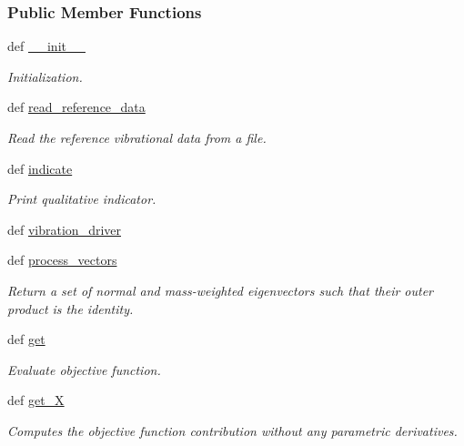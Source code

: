 \subsubsection*{Public Member Functions}
\begin{DoxyCompactItemize}
\item 
def \hyperlink{classforcebalance_1_1vibration_1_1Vibration_af449471c321f81318a76c327a9767cd9}{\-\_\-\-\_\-init\-\_\-\-\_\-}
\begin{DoxyCompactList}\small\item\em Initialization. \end{DoxyCompactList}\item 
def \hyperlink{classforcebalance_1_1vibration_1_1Vibration_ad3fc1fdf6452b11933d234b46b07071d}{read\-\_\-reference\-\_\-data}
\begin{DoxyCompactList}\small\item\em Read the reference vibrational data from a file. \end{DoxyCompactList}\item 
def \hyperlink{classforcebalance_1_1vibration_1_1Vibration_a1f13ce8796e3d089c9a361f43844bb98}{indicate}
\begin{DoxyCompactList}\small\item\em Print qualitative indicator. \end{DoxyCompactList}\item 
def \hyperlink{classforcebalance_1_1vibration_1_1Vibration_afa414133f30a224687fcd34eca008744}{vibration\-\_\-driver}
\item 
def \hyperlink{classforcebalance_1_1vibration_1_1Vibration_a5365302b992fdb2656aa2bc0bb6c6079}{process\-\_\-vectors}
\begin{DoxyCompactList}\small\item\em Return a set of normal and mass-\/weighted eigenvectors such that their outer product is the identity. \end{DoxyCompactList}\item 
def \hyperlink{classforcebalance_1_1vibration_1_1Vibration_a3b20f6a97f3aba4f704056ed12a999a5}{get}
\begin{DoxyCompactList}\small\item\em Evaluate objective function. \end{DoxyCompactList}\item 
def \hyperlink{classforcebalance_1_1target_1_1Target_a606dd136f195c267c05a2455405e5949}{get\-\_\-\-X}
\begin{DoxyCompactList}\small\item\em Computes the objective function contribution without any parametric derivatives. \end{DoxyCompactList}\item 

\end{DoxyCompactItemize}
